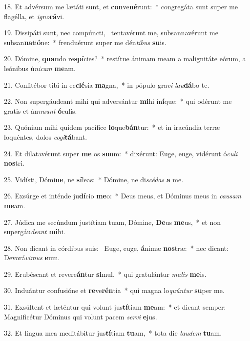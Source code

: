 18. Et advérsum me lætáti sunt, et \textbf{con}ve\textbf{né}runt:~*  congregáta sunt super me flagélla, et \textit{i}\textit{gno}\textbf{rá}vi.\

19. Dissipáti sunt, nec compúncti, \dag\  tentavérunt me, subsannavérunt me subsan\textbf{na}ti\textbf{ó}ne:~*  frenduérunt super me dén\textit{ti}\textit{bus} \textbf{su}is.\

20. Dómine, \textbf{quan}do re\textbf{spí}cies?~*  restítue ánimam meam a malignitáte eórum, a leónibus ú\textit{ni}\textit{cam} \textbf{me}am.\

21. Confitébor tibi in ec\textbf{clé}sia \textbf{ma}gna,~*  in pópulo gra\textit{vi} \textit{lau}\textbf{dá}bo te.\

22. Non supergáudeant mihi qui adversántur \textbf{mi}hi in\textbf{í}que:~*  qui odérunt me gratis et án\textit{nu}\textit{unt} \textbf{ó}culis.\

23. Quóniam mihi quidem pacífice \textbf{lo}que\textbf{bán}tur:~*  et in iracúndia terræ loquéntes, dolos \textit{co}\textit{gi}\textbf{tá}bant.\

24. Et dilatavérunt super \textbf{me} os \textbf{su}um:~*  dixérunt: Euge, euge, vidérunt ó\textit{cu}\textit{li} \textbf{nos}tri.\

25. Vidísti, Dómi\textbf{ne}, ne \textbf{sí}leas:~*  Dómine, ne di\textit{scé}\textit{das} \textbf{a} me.\

26. Exsúrge et inténde ju\textbf{dí}cio \textbf{me}o:~*  Deus meus, et Dóminus meus in \textit{cau}\textit{sam} \textbf{me}am.\

27. Júdica me secúndum justítiam tuam, Dómine, \textbf{De}us \textbf{me}us,~*  et non supergáu\textit{de}\textit{ant} \textbf{mi}hi.\

28. Non dicant in córdibus suis: \dag\  Euge, euge, \textbf{á}nimæ \textbf{nos}træ:~*  nec dicant: Devorá\textit{vi}\textit{mus} \textbf{e}um.\

29. Erubéscant et revere\textbf{án}tur \textbf{si}mul,~*  qui gratulántur \textit{ma}\textit{lis} \textbf{me}is.\

30. Induántur confusióne et \textbf{re}ve\textbf{rén}tia~*  qui magna lo\textit{quún}\textit{tur} \textbf{su}per me.\

31. Exsúltent et læténtur qui volunt jus\textbf{tí}tiam \textbf{me}am:~*  et dicant semper: Magnificétur Dóminus qui volunt pacem \textit{ser}\textit{vi} \textbf{e}jus.\

32. Et lingua mea meditábitur jus\textbf{tí}tiam \textbf{tu}am,~*  tota die \textit{lau}\textit{dem} \textbf{tu}am.\

